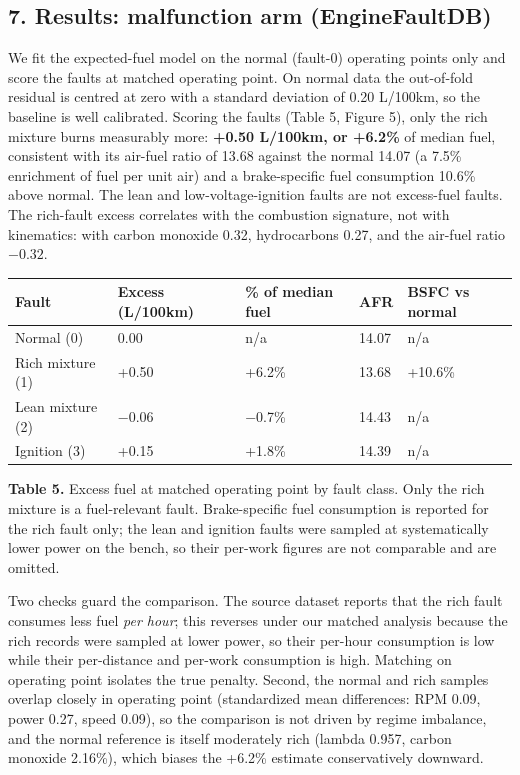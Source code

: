\subsection{7. Results: malfunction arm (EngineFaultDB)}\label{arm2}

We fit the expected-fuel model on the normal (fault-0) operating points
only and score the faults at matched operating point. On normal data the
out-of-fold residual is centred at zero with a standard deviation of
0.20 L/100km, so the baseline is well calibrated. Scoring the faults
(Table 5, Figure 5), only the rich mixture burns measurably more:
\textbf{+0.50 L/100km, or +6.2\%} of median fuel, consistent with its
air-fuel ratio of 13.68 against the normal 14.07 (a 7.5\% enrichment of
fuel per unit air) and a brake-specific fuel consumption 10.6\% above
normal. The lean and low-voltage-ignition faults are not excess-fuel
faults. The rich-fault excess correlates with the combustion signature,
not with kinematics: with carbon monoxide 0.32, hydrocarbons 0.27, and
the air-fuel ratio \(-0.32\).

\begin{longtable}[]{@{}lllll@{}}
\toprule\noalign{}
Fault & Excess (L/100km) & \% of median fuel & AFR & BSFC vs normal \\
\midrule\noalign{}
\endhead
\bottomrule\noalign{}
\endlastfoot
Normal (0) & 0.00 & n/a & 14.07 & n/a \\
Rich mixture (1) & +0.50 & +6.2\% & 13.68 & +10.6\% \\
Lean mixture (2) & −0.06 & −0.7\% & 14.43 & n/a \\
Ignition (3) & +0.15 & +1.8\% & 14.39 & n/a \\
\end{longtable}

\textbf{Table 5.} Excess fuel at matched operating point by fault class.
Only the rich mixture is a fuel-relevant fault. Brake-specific fuel
consumption is reported for the rich fault only; the lean and ignition
faults were sampled at systematically lower power on the bench, so their
per-work figures are not comparable and are omitted.

Two checks guard the comparison. The source dataset reports that the
rich fault consumes less fuel \emph{per hour}; this reverses under our
matched analysis because the rich records were sampled at lower power,
so their per-hour consumption is low while their per-distance and
per-work consumption is high. Matching on operating point isolates the
true penalty. Second, the normal and rich samples overlap closely in
operating point (standardized mean differences: RPM 0.09, power 0.27,
speed 0.09), so the comparison is not driven by regime imbalance, and
the normal reference is itself moderately rich (lambda 0.957, carbon
monoxide 2.16\%), which biases the +6.2\% estimate conservatively
downward.

